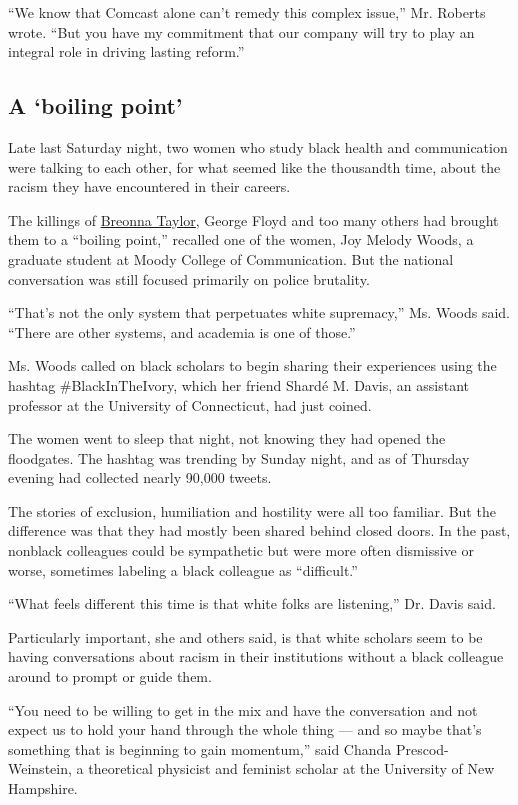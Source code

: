 ``We know that Comcast alone can't remedy this complex issue,'' Mr.
Roberts wrote. ``But you have my commitment that our company will try to
play an integral role in driving lasting reform.''

\hypertarget{a-boiling-point}{%
\subsection{A `boiling point'}\label{a-boiling-point}}

Late last Saturday night, two women who study black health and
communication were talking to each other, for what seemed like the
thousandth time, about the racism they have encountered in their
careers.

The killings of
\href{https://www.nytimes.com/article/breonna-taylor-police.html}{Breonna
Taylor}, George Floyd and too many others had brought them to a
``boiling point,'' recalled one of the women, Joy Melody Woods, a
graduate student at Moody College of Communication. But the national
conversation was still focused primarily on police brutality.

``That's not the only system that perpetuates white supremacy,'' Ms.
Woods said. ``There are other systems, and academia is one of those.''

Ms. Woods called on black scholars to begin sharing their experiences
using the hashtag \#BlackInTheIvory, which her friend Shardé M. Davis,
an assistant professor at the University of Connecticut, had just
coined.

The women went to sleep that night, not knowing they had opened the
floodgates. The hashtag was trending by Sunday night, and as of Thursday
evening had collected nearly 90,000 tweets.

The stories of exclusion, humiliation and hostility were all too
familiar. But the difference was that they had mostly been shared behind
closed doors. In the past, nonblack colleagues could be sympathetic but
were more often dismissive or worse, sometimes labeling a black
colleague as ``difficult.''

``What feels different this time is that white folks are listening,''
Dr. Davis said.

Particularly important, she and others said, is that white scholars seem
to be having conversations about racism in their institutions without a
black colleague around to prompt or guide them.

``You need to be willing to get in the mix and have the conversation and
not expect us to hold your hand through the whole thing --- and so maybe
that's something that is beginning to gain momentum,'' said Chanda
Prescod-Weinstein, a theoretical physicist and feminist scholar at the
University of New Hampshire.

